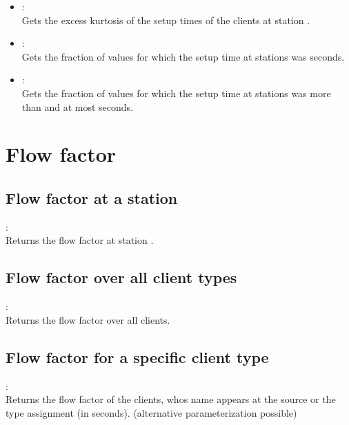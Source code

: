 \begin{itemize}
\item
{}:\\
Gets the excess kurtosis of the setup times of the clients at station . 

\item
{}:\\
Gets the fraction of values for which the setup time at stations  was  seconds.

\item
{}:\\
Gets the fraction of values for which the setup time at stations  was more than  and at most  seconds.

\end{itemize}



\section{Flow factor}



\subsection{Flow factor at a station}

:\\
Returns the flow factor at station .



\subsection{Flow factor over all client types}
  
:\\
Returns the flow factor over all clients.



\subsection{Flow factor for a specific client type}

:\\
Returns the flow factor of the clients, whos name appears at the source or the type assignment  (in seconds).
(alternative parameterization possible)



